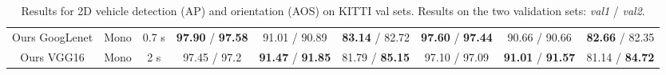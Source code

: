 \documentclass[10pt,twocolumn,letterpaper]{article}
\begin{document}
\begin{table*}[ht]
{\begin{tabular}{ccc|c|c|c|c|c|c|}
\multicolumn{1}{|c|}{Ours GoogLenet}     				& \multicolumn{1}{c|}{Mono} & 0.7 s & \textbf{97.90} / \textbf{97.58} & 91.01 / 90.89 & \textbf{83.14} / 82.72& \textbf{97.60} / \textbf{97.44} & 90.66 / 90.66 & \textbf{82.66} / 82.35 \\ 
\multicolumn{1}{|c|}{Ours VGG16}     			& \multicolumn{1}{c|}{Mono} & 2 s & 97.45 / 97.2 & \textbf{91.47} / \textbf{91.85} & 81.79 / \textbf{85.15} & 97.10 / 97.09& \textbf{91.01} / \textbf{91.57} & 81.14 / \textbf{84.72}\\

\hline
\end{tabular}
}
\vspace*{2mm}
\caption{Results for 2D vehicle detection (AP) and orientation (AOS) on KITTI val sets. Results on the two validation sets: \textit{val1} / \textit{val2}.}
\label{AP_AOS_val}
\end{table*}
\end{document}
